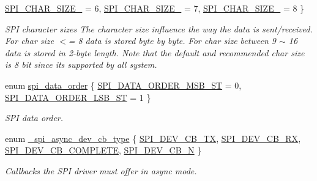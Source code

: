 \begin{DoxyCompactItemize}
\hyperlink{group__hpl__spi_gga4a3ef460c2cea333834811806f32d60aa362b90f6a542d1562e07f7083bf01356}{S\+P\+I\+\_\+\+C\+H\+A\+R\+\_\+\+S\+I\+Z\+E\+\_} = 6, 
\hyperlink{group__hpl__spi_gga4a3ef460c2cea333834811806f32d60aa8e89f50814cf80957ef5a5849712384e}{S\+P\+I\+\_\+\+C\+H\+A\+R\+\_\+\+S\+I\+Z\+E\+\_} = 7, 
\newline
\hyperlink{group__hpl__spi_gga4a3ef460c2cea333834811806f32d60aa86b0b19ae92d22dbfe40f979ce399140}{S\+P\+I\+\_\+\+C\+H\+A\+R\+\_\+\+S\+I\+Z\+E\+\_} = 8
 \}\begin{DoxyCompactList}\small\item\em S\+PI character sizes The character size influence the way the data is sent/received. For char size $<$= 8 data is stored byte by byte. For char size between 9 $\sim$ 16 data is stored in 2-\/byte length. Note that the default and recommended char size is 8 bit since it\textquotesingle{}s supported by all system. \end{DoxyCompactList}
\item 
enum \hyperlink{group__hpl__spi_gabaa69dbc0601cb5b1e2681400598a4b2}{spi\+\_\+data\+\_\+order} \{ \hyperlink{group__hpl__spi_ggabaa69dbc0601cb5b1e2681400598a4b2a7875038b58baad2610da7f3ef2cd0325}{S\+P\+I\+\_\+\+D\+A\+T\+A\+\_\+\+O\+R\+D\+E\+R\+\_\+\+M\+S\+B\+\_\+ST} = 0, 
\hyperlink{group__hpl__spi_ggabaa69dbc0601cb5b1e2681400598a4b2ac8b791b014c96eee8c4880c0a743cd10}{S\+P\+I\+\_\+\+D\+A\+T\+A\+\_\+\+O\+R\+D\+E\+R\+\_\+\+L\+S\+B\+\_\+ST} = 1
 \}\begin{DoxyCompactList}\small\item\em S\+PI data order. \end{DoxyCompactList}
\item 
enum \hyperlink{group__hpl__spi_ga0f0c72bc59abef8035904e8e267dfde9}{\+\_\+spi\+\_\+async\+\_\+dev\+\_\+cb\+\_\+type} \{ \hyperlink{group__hpl__spi_gga0f0c72bc59abef8035904e8e267dfde9a2737d518cdb51d60e7b2d7c3d793dc59}{S\+P\+I\+\_\+\+D\+E\+V\+\_\+\+C\+B\+\_\+\+TX}, 
\hyperlink{group__hpl__spi_gga0f0c72bc59abef8035904e8e267dfde9a9bd42857f574c730b26d17c12946f337}{S\+P\+I\+\_\+\+D\+E\+V\+\_\+\+C\+B\+\_\+\+RX}, 
\hyperlink{group__hpl__spi_gga0f0c72bc59abef8035904e8e267dfde9a37eb945faf2d105fc98a372ec31a57e1}{S\+P\+I\+\_\+\+D\+E\+V\+\_\+\+C\+B\+\_\+\+C\+O\+M\+P\+L\+E\+TE}, 
\hyperlink{group__hpl__spi_gga0f0c72bc59abef8035904e8e267dfde9a2433e69f88c4631aebf9c7471420a747}{S\+P\+I\+\_\+\+D\+E\+V\+\_\+\+C\+B\+\_\+N}
 \}\begin{DoxyCompactList}\small\item\em Callbacks the S\+PI driver must offer in async mode. \end{DoxyCompactList}
\end{DoxyCompactItemize}
